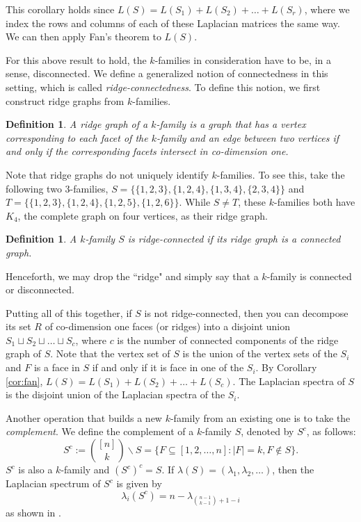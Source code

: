 \documentclass[11pt]{article}
\newtheorem{defi}[lm]{Definition}
\begin{document}
This corollary holds since $L(S ) = L(S_1) + L(S_2) + \ldots + L(S_r)$, where we index the rows and columns of each of these Laplacian matrices the same way. We can then apply Fan's theorem to $L(S)$.

For this above result to hold, the $k$-families in consideration have to be, in a sense, disconnected. We define a generalized notion of connectedness in this setting, which is called \emph{ridge-connectedness}. To define this notion, we first construct ridge graphs from $k$-families.


\begin{defi}
A \emph{ridge graph} of a $k$-family is a graph that has a vertex corresponding to each facet of the $k$-family and an edge between two vertices if and only if the corresponding facets intersect in co-dimension one.
\end{defi}

Note that ridge graphs do not uniquely identify $k$-families. To see this, take the following two $3$-families, $S = \{ \{1,2, 3\}, \{1, 2, 4\}, \{1, 3, 4\}, \{2, 3, 4\}\}$ and $T = \{\{1,2, 3\}, \{1, 2, 4\}, \{1, 2, 5\}, \{1, 2, 6\}\}$. While $S \neq T$, these $k$-families both have $K_4$, the complete graph on four vertices, as their ridge graph.






\begin{defi}
A $k$-family $S$ is ridge-connected if its ridge graph is a connected graph. 
\end{defi}


Henceforth, we may drop the ``ridge" and simply say that a $k$-family is connected or disconnected. 

Putting all of this together, if $S$ is not ridge-connected, then you can decompose its set $R$ of co-dimension one faces (or ridges) into a disjoint union $S_1 \sqcup S_2 \sqcup \ldots \sqcup S_c$, where $c$ is the number of connected components of the ridge graph of $S$. Note that the vertex set of $S$ is the union of the vertex sets of the $S_i$ and $F$ is a face in $S$ if and only if it is face in one of the $S_i$. By Corollary \ref{cor:fan}, $L(S) = L(S_1) + L(S_2) + \ldots + L(S_c)$. The Laplacian spectra of $S$ is the disjoint union of the Laplacian spectra of the $S_i$. 


Another operation that builds a new $k$-family from an existing one is to take the \emph{complement}. We define the complement of a $k$-family $S$, denoted by $S^c$, as follows:
$$S^c := \binom{[n]}{k} \backslash S = \{F \subseteq [1, 2, \ldots, n]: |F| = k, F \notin S\}.$$
$S^c$ is also a $k$-family and $(S^c)^c = S$. If $\lambda(S) = ( \lambda_1, \lambda_2, \ldots)$, then the Laplacian spectrum of $S^c$ is given by
$$\lambda_i(S^c) = n - \lambda_{\binom{n -1}{k - 1} + 1 - i}$$
as shown in \cite{DR}.
\end{document}
